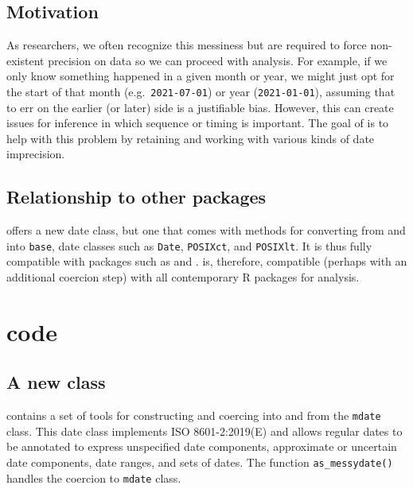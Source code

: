 \documentclass[
]{jss}
\begin{document}
\hypertarget{motivation}{%
\subsection{Motivation}\label{motivation}}

As researchers, we often recognize this messiness but are required to
force non-existent precision on data so we can proceed with analysis.
For example, if we only know something happened in a given month or
year, we might just opt for the start of that month
(e.g.~\texttt{2021-07-01}) or year (\texttt{2021-01-01}), assuming that
to err on the earlier (or later) side is a justifiable bias. However,
this can create issues for inference in which sequence or timing is
important. The goal of  is to help with this problem by
retaining and working with various kinds of date imprecision.

\hypertarget{relationship-to-other-packages}{%
\subsection{Relationship to other
packages}\label{relationship-to-other-packages}}

 offers a new date class, but one that comes with
methods for converting from and into \texttt{base}, date classes such as
\texttt{Date}, \texttt{POSIXct}, and \texttt{POSIXlt}. It is thus fully
compatible with packages such as 
\citep{grolemundDatesTimesMade2011} and 
\citep{eddelbuettelAnytimeEasierDate2019}.  is,
therefore, compatible (perhaps with an additional coercion step) with
all contemporary R packages for analysis.

\section[R code]{ code}\label{r-code}

\hypertarget{a-new-class}{%
\subsection{A new class}\label{a-new-class}}

 contains a set of tools for constructing and coercing
into and from the \texttt{mdate} class. This date class implements ISO
8601-2:2019(E) and allows regular dates to be annotated to express
unspecified date components, approximate or uncertain date components,
date ranges, and sets of dates. The function \texttt{as\_messydate()}
handles the coercion to \texttt{mdate} class.
\end{document}
